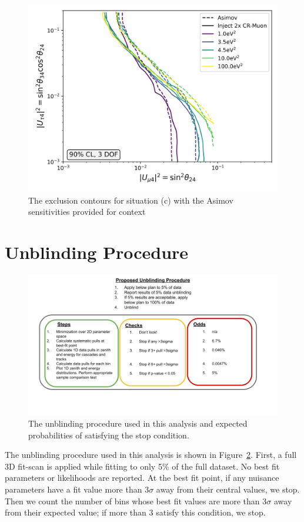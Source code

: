 \documentclass[main.tex]{subfiles}
\begin{document}
\begin{figure}
    \centering
    \includegraphics[width=0.7\linewidth]{figures/double_muon_mismodel_worse_Realization_doublcr_sterile_0_cl0.9_dof3.png}
    \caption{The exclusion contours for situation (c) with the Asimov sensitivities provided for context}\label{fig:last_muon_sad}
\end{figure}    


\section{Unblinding Procedure}

\begin{figure}
    \centering
    \includegraphics[width=0.7\linewidth]{figures/unblinding.png}
    \caption{The unblinding procedure used in this analysis and expected probabilities of satisfying the stop condition.}\label{fig:unblind}
\end{figure}

The unblinding procedure used in this analysis is shown in Figure~\ref{fig:unblind}. 
First, a full 3D fit-scan is applied while fitting to only 5\% of the full dataset. 
No best fit parameters or likelihoods are reported. 
At the best fit point, if any nuisance parameters have a fit value more than $3\sigma$ away from their central values, we stop. 
Then we count the number of bins whose best fit values are more than $3\sigma$ away from their expected value; if more than 3 satisfy this condition, we stop. 
\end{document}
